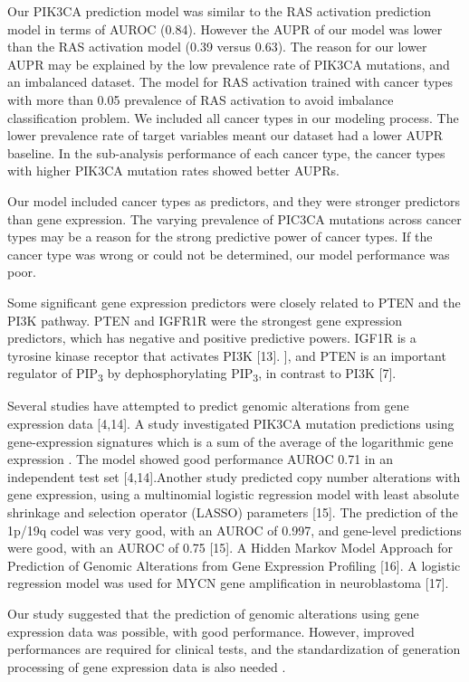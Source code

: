 \documentclass[10pt,letterpaper]{article}
\begin{document}
Our PIK3CA prediction model was similar to the RAS activation prediction
model in terms of AUROC (0.84). However the AUPR of our model was lower
than the RAS activation model (0.39 versus 0.63). The reason for our
lower AUPR may be explained by the low prevalence rate of PIK3CA
mutations, and an imbalanced dataset. The model for RAS activation
trained with cancer types with more than 0.05 prevalence of RAS
activation to avoid imbalance classification problem. We included all
cancer types in our modeling process. The lower prevalence rate of
target variables meant our dataset had a lower AUPR baseline. In the
sub-analysis performance of each cancer type, the cancer types with
higher PIK3CA mutation rates showed better AUPRs.

Our model included cancer types as predictors, and they were stronger
predictors than gene expression. The varying prevalence of PIC3CA
mutations across cancer types may be a reason for the strong predictive
power of cancer types. If the cancer type was wrong or could not be
determined, our model performance was poor.

Some significant gene expression predictors were closely related to PTEN
and the PI3K pathway. PTEN and IGFR1R were the strongest gene expression
predictors, which has negative and positive predictive powers. IGF1R is
a tyrosine kinase receptor that activates PI3K {[}13{]}. {]}, and PTEN
is an important regulator of PIP\textsubscript{3} by dephosphorylating
PIP\textsubscript{3}, in contrast to PI3K {[}7{]}.

Several studies have attempted to predict genomic alterations from gene
expression data {[}4,14{]}. A study investigated PIK3CA mutation
predictions using gene-expression signatures which is a sum of the
average of the logarithmic gene expression . The model showed good
performance AUROC 0.71 in an independent test set {[}4,14{]}.Another
study predicted copy number alterations with gene expression, using a
multinomial logistic regression model with least absolute shrinkage and
selection operator (LASSO) parameters {[}15{]}. The prediction of the
1p/19q codel was very good, with an AUROC of 0.997, and gene-level
predictions were good, with an AUROC of 0.75 {[}15{]}. A Hidden Markov
Model Approach for Prediction of Genomic Alterations from Gene
Expression Profiling {[}16{]}. A logistic regression model was used for
MYCN gene amplification in neuroblastoma {[}17{]}.

Our study suggested that the prediction of genomic alterations using
gene expression data was possible, with good performance. However,
improved performances are required for clinical tests, and the
standardization of generation processing of gene expression data is also
needed .
\end{document}
